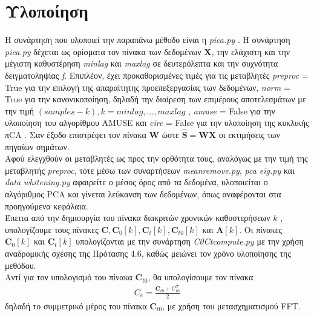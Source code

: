 \section{Υλοποίηση}
\justifying
Η συνάρτηση που υλοποιεί την παραπάνω μέθοδο είναι η \en \emph{pica.py} \cite{codes:28}. \gr Η συνάρτηση \en \emph{pica.py} \gr δέχεται ως ορίσματα τον πίνακα των δεδομένων \en $\mathbf{X}$, \gr την ελάχιστη και την μέγιστη καθυστέρηση \en \emph{minlag} \gr και \en \emph{maxlag} \gr σε δευτερόλεπτα και την συχνότητα δειγματοληψίας \en \emph{f}. \gr  Επιπλέον, έχει προκαθορισμένες τιμές για τις μεταβλητές \en \emph{preproc} = True \gr για την επιλογή της απαραίτητης προεπεξεργασίας των δεδομένων, \en \emph{norm} = True \gr για την κανονικοποίηση, δηλαδή την διαίρεση των επιμέρους αποτελεσμάτων με την τιμή \en $(samples - k) , k =  minlag, \ldots, maxlag $ \gr, \en \emph{amuse} = False \gr για την υλοποίηση του αλγορίθμου \en AMUSE \gr και \en \emph{circ} = False \gr για την υλοποίηση της κυκλικής π\en CA \gr. Σαν έξοδο επιστρέφει τον πίνακα \en $\mathbf{W}$ \gr ώστε \en $ \mathbf{\hat{S}} = \mathbf{W} \mathbf{X}$ \gr οι εκτιμήσεις των πηγαίων σημάτων.
\\[0.5 \baselineskip]
Αφού ελεγχθούν οι μεταβλητές ως προς την ορθότητα τους, αναλόγως με την τιμή της μεταβλητής \en \emph{preproc}, \gr τότε μέσω των συναρτήσεων \en \emph{mean\textunderscore remove.py}, \emph{pca \textunderscore eig.py} \gr και \en \emph{data \textunderscore whitening.py} \gr  αφαιρείτε ο μέσος όρος από τα δεδομένα, υλοποιείται ο αλγόριθμος \en PCA \gr και γίνεται λεύκανση των δεδομένων, όπως αναφέρονται στα προηγούμενα κεφάλαια.
\\[0.5 \baselineskip]
Έπειτα από την δημιουργία του πίνακα διακριτών χρονικών καθυστερήσεων \en $k$ , \gr υπολογίζουμε τους πίνακες \en $\mathbf{C} , \mathbf{C}_0[k] , \mathbf{C}_t[k] , \mathbf{C}_{t0}[k]$ \gr και \en $\mathbf{A}[k]$. \gr Οι πίνακες \en $\mathbf{C}_{0}[k]$ \gr και \en $\mathbf{C}_{t}[k]$ \gr υπολογίζονται με την συνάρτηση \en \emph{C0\textunderscore Ct\textunderscore compute.py} \gr με την χρήση αναδρομικής σχέσης της Πρότασης 4.6, καθώς μειώνει τον χρόνο υλοποίησης της μεθόδου.
\\[0.5 \baselineskip]
Αντί για τον υπολογισμό του πίνακα \en $\mathbf{C}_{t0}$, \gr θα υπολογίσουμε τον πίνακα
\begin{align} \label{eq:4.6.1}
    C_e = \frac{ \mathbf{C}_{t0} + C_{t0}^T}{2}
\end{align}
δηλαδή το συμμετρικό μέρος του πίνακα \en $\mathbf{C}_{t0}$, \gr με χρήση του μετασχηματισμού \en FFT. \gr 
